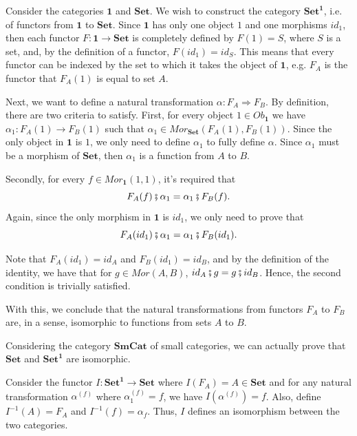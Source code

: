 \begin{example}
	Consider the categories $\bm 1$ and $\mathbf{Set}$. We wish to
	construct the category $\mathbf{Set}^{\bm 1}$, i.e. of functors from $\bm 1$
	to $\mathbf{Set}$. Since $\bm 1$ has only one object $1$ and one morphisms $id_1$, then each functor
	$F:\bm 1 \to \mathbf{Set}$ is completely defined by $F(1) = S$, where $S$ is a set, and,
	by the definition of a functor, $F(id_1) = id_S$. This means that every functor
	can be indexed by the set to which it takes the object of $\bm 1$, e.g. $F_A$ is the
	functor that $F_A(1)$ is equal to set $A$.

	Next, we want to define a natural transformation $\alpha: F_A \Rightarrow F_B$.
	By definition, there are two criteria to satisfy. First,
	for every object $1 \in Ob_{\bm 1}$ we have
	$\alpha_1:F_A(1) \to F_B(1)$ such that $\alpha_1 \in Mor_{\mathbf{Set}}(F_A(1),F_B(1))$.
	Since the only object in $\bm 1$ is $1$, we only need to define $\alpha_1$ to fully define $\alpha$.
	Since $\alpha_1$ must be a morphism of $\mathbf{Set}$, then $\alpha_1$ is a function
	from $A$ to $B$.

	Secondly, for every $f \in Mor_{\bm 1} (1,1)$, it's required that
	\begin{displaymath}
		F_A(f) \fatsemi \alpha_1 = \alpha_1 \fatsemi F_B(f).
	\end{displaymath}
	Again, since the only morphism in $\bm 1$ is $id_1$, we only need to prove that
	\begin{displaymath}
		F_A(id_1) \fatsemi \alpha_1 = \alpha_1 \fatsemi F_B(id_1).
	\end{displaymath}

	Note that $F_A(id_1) = id_A$ and $F_B(id_1) = id_B$, and by the definition
	of the identity, we have that for $g \in Mor(A,B)$, $id_A \fatsemi g = g \fatsemi id_B$.
	Hence, the second condition is trivially satisfied.

	With this, we conclude that the natural transformations from
	functors $F_A$ to $F_B$ are, in a sense, isomorphic to functions from sets
	$A$ to $B$.

	Considering the category $\mathbf{SmCat}$ of small categories, we can actually prove
	that $\mathbf{Set}$ and $\mathbf{Set}^{\bm 1}$ are isomorphic.

	Consider the functor
	$I:\mathbf{Set}^{\bm 1} \to \mathbf{Set}$ where $I(F_A) = A \in \mathbf{Set}$ and
	for any natural transformation $\alpha^{(f)}$ where $\alpha^{(f)}_1 = f$, we have
	$I(\alpha^{(f)}) = f$. Also, define $I^{-1}(A) = F_A$ and
	$I^{-1}(f) = \alpha_f$.
	Thus, $I$ defines an isomorphism between the two categories.

\end{example}

